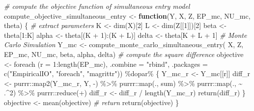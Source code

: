 \documentclass[
]{article}
\newenvironment{Shaded}{\begin{snugshade}}{\end{snugshade}}
\newcommand{\AttributeTok}[1]{\textcolor[rgb]{0.77,0.63,0.00}{#1}}
\newcommand{\CommentTok}[1]{\textcolor[rgb]{0.56,0.35,0.01}{\textit{#1}}}
\newcommand{\ControlFlowTok}[1]{\textcolor[rgb]{0.13,0.29,0.53}{\textbf{#1}}}
\newcommand{\DecValTok}[1]{\textcolor[rgb]{0.00,0.00,0.81}{#1}}
\newcommand{\FunctionTok}[1]{\textcolor[rgb]{0.00,0.00,0.00}{#1}}
\newcommand{\NormalTok}[1]{#1}
\newcommand{\OtherTok}[1]{\textcolor[rgb]{0.56,0.35,0.01}{#1}}
\newcommand{\SpecialCharTok}[1]{\textcolor[rgb]{0.00,0.00,0.00}{#1}}
\newcommand{\StringTok}[1]{\textcolor[rgb]{0.31,0.60,0.02}{#1}}
\begin{document}
\begin{Shaded}
\begin{Highlighting}[]
\CommentTok{\# compute the objective function of simultaneous entry model}
\NormalTok{compute\_objective\_simultaneous\_entry }\OtherTok{\textless{}{-}}
  \ControlFlowTok{function}\NormalTok{(Y, X, Z, EP\_mc, NU\_mc, theta) \{}
    \CommentTok{\# extract parameters}
\NormalTok{    K }\OtherTok{\textless{}{-}} \FunctionTok{dim}\NormalTok{(X)[}\DecValTok{2}\NormalTok{]}
\NormalTok{    L }\OtherTok{\textless{}{-}} \FunctionTok{dim}\NormalTok{(Z[[}\DecValTok{1}\NormalTok{]])[}\DecValTok{2}\NormalTok{]}
\NormalTok{    beta }\OtherTok{\textless{}{-}}\NormalTok{ theta[}\DecValTok{1}\SpecialCharTok{:}\NormalTok{K]}
\NormalTok{    alpha }\OtherTok{\textless{}{-}}\NormalTok{ theta[(K }\SpecialCharTok{+} \DecValTok{1}\NormalTok{)}\SpecialCharTok{:}\NormalTok{(K }\SpecialCharTok{+}\NormalTok{ L)]}
\NormalTok{    delta }\OtherTok{\textless{}{-}}\NormalTok{ theta[K }\SpecialCharTok{+}\NormalTok{ L }\SpecialCharTok{+} \DecValTok{1}\NormalTok{]}
    \CommentTok{\# Monte Carlo Simulation}
\NormalTok{    Y\_mc }\OtherTok{\textless{}{-}}
      \FunctionTok{compute\_monte\_carlo\_simultaneous\_entry}\NormalTok{(}
\NormalTok{        X, Z, EP\_mc, NU\_mc, beta, alpha, delta)}
    \CommentTok{\# compute the square difference}
\NormalTok{    objective }\OtherTok{\textless{}{-}}
      \FunctionTok{foreach}\NormalTok{ (}\AttributeTok{r =} \DecValTok{1}\SpecialCharTok{:}\FunctionTok{length}\NormalTok{(EP\_mc), }\AttributeTok{.combine =} \StringTok{"rbind"}\NormalTok{, }\AttributeTok{.packages =} \FunctionTok{c}\NormalTok{(}\StringTok{"EmpiricalIO"}\NormalTok{, }\StringTok{"foreach"}\NormalTok{, }\StringTok{"magrittr"}\NormalTok{)) }\SpecialCharTok{\%dopar\%}\NormalTok{ \{}
\NormalTok{        Y\_mc\_r }\OtherTok{\textless{}{-}}\NormalTok{ Y\_mc[[r]]}
\NormalTok{        diff\_r }\OtherTok{\textless{}{-}}\NormalTok{ purrr}\SpecialCharTok{::}\FunctionTok{map2}\NormalTok{(Y\_mc\_r, Y, }\StringTok{\textasciigrave{}}\AttributeTok{{-}}\StringTok{\textasciigrave{}}\NormalTok{) }\SpecialCharTok{\%\textgreater{}\%}
\NormalTok{          purrr}\SpecialCharTok{::}\FunctionTok{map}\NormalTok{(., sum) }\SpecialCharTok{\%\textgreater{}\%}
\NormalTok{          purrr}\SpecialCharTok{::}\FunctionTok{map}\NormalTok{(., }\SpecialCharTok{\textasciitilde{}}\NormalTok{ .}\SpecialCharTok{\^{}}\DecValTok{2}\NormalTok{) }\SpecialCharTok{\%\textgreater{}\%}
\NormalTok{          purrr}\SpecialCharTok{::}\FunctionTok{reduce}\NormalTok{(}\StringTok{\textasciigrave{}}\AttributeTok{+}\StringTok{\textasciigrave{}}\NormalTok{)}
\NormalTok{        diff\_r }\OtherTok{\textless{}{-}}\NormalTok{ diff\_r }\SpecialCharTok{/} \FunctionTok{length}\NormalTok{(Y\_mc\_r)}
        \FunctionTok{return}\NormalTok{(diff\_r)}
\NormalTok{      \}}
\NormalTok{    objective }\OtherTok{\textless{}{-}} \FunctionTok{mean}\NormalTok{(objective)}
    \CommentTok{\# return}
    \FunctionTok{return}\NormalTok{(objective)}
\NormalTok{  \}}


\end{Highlighting}
\end{Shaded}
\end{document}
